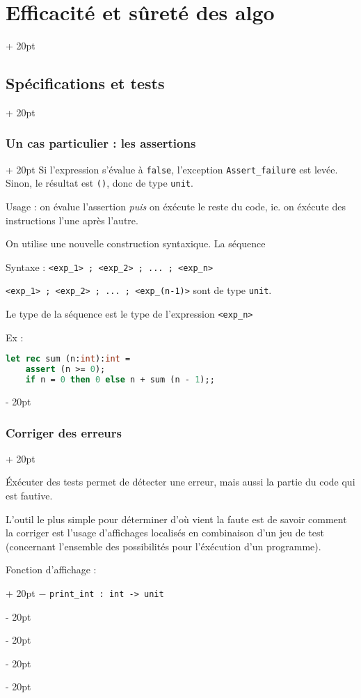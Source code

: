 \documentclass[a4paper, 12pt, twoside]{article}
\newcommand{\ind}[1][20pt]{\advance\leftskip + #1}
\newcommand{\deind}[1][20pt]{\advance\leftskip - #1}
\newenvironment{indentedenv}[1][20pt]{\par \ind[#1]}{\par \deind}
\newenvironment{indt}[2][20pt]{#2 \begin{indentedenv}[#1]}{\end{indentedenv}} %
\begin{document}
\begin{indt}{\section{Efficacité et sûreté des algo}}
\begin{indt}{\subsection{Spécifications et tests}}
\begin{indt}{\subsubsection{Un cas particulier : les assertions}}
                Si l'expression s'évalue à \texttt{false}, l'exception \texttt{Assert\_failure} est levée.
                Sinon, le résultat est \texttt{()}, donc de type \texttt{unit}.
                
                Usage : on évalue l'assertion \textit{puis} on éxécute le reste du code, ie. on éxécute des instructions l'une après l'autre.
                
                On utilise une nouvelle construction syntaxique. La séquence
                
                Syntaxe : \texttt{<exp\_1> ; <exp\_2> ; ... ; <exp\_n>}
                
                \texttt{<exp\_1> ; <exp\_2> ; ... ; <exp\_(n-1)>} sont de type \texttt{unit}.
                
                Le type de la séquence est le type de l'expression \texttt{<exp\_n>}
                
                Ex :
                \begin{lstlisting}[language=Caml, xleftmargin=80pt]
let rec sum (n:int):int =
    assert (n >= 0);
    if n = 0 then 0 else n + sum (n - 1);;
                \end{lstlisting}
                
            \end{indt}
            
            \vspace{12pt}
            
            \begin{indt}{\subsubsection{Corriger des erreurs}}
                
                \'Exécuter des tests permet de détecter une erreur, mais aussi la partie du code qui est fautive.
                
                L'outil le plus simple pour déterminer d'où vient la faute est de savoir comment la corriger est l'usage d'affichages localisés en combinaison d'un jeu de test (concernant l'ensemble des possibilités pour l'éxécution d'un programme).
                
                \vspace{6pt}
                
                \begin{indt}{Fonction d'affichage :}
                    $-$ \texttt{print\_int : int -> unit}
                    

\end{indt}
\end{indt}
\end{indt}
\end{indt}
\end{document}
